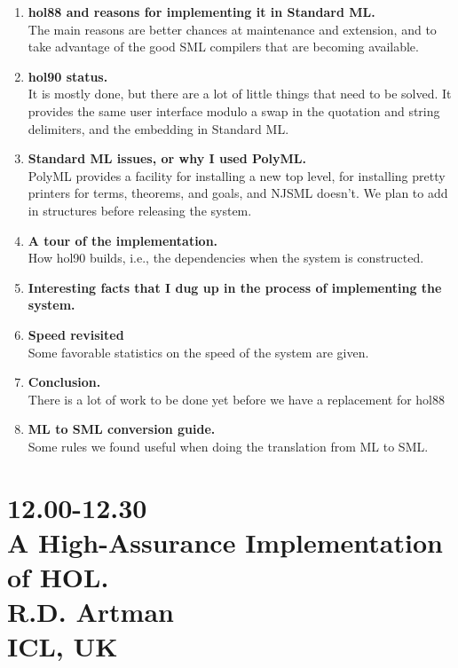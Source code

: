 \begin{enumerate}
\item {\bf hol88 and reasons for implementing it in Standard ML.}\\
     The main reasons are better chances at maintenance and
     extension, and to take advantage of the good SML compilers
     that are becoming available.

\item {\bf hol90 status.}\\
     It is mostly done, but there are a lot of little things
     that need to be solved. It provides the same user interface 
     modulo a swap in the quotation and string delimiters, and the 
     embedding in Standard ML. 

\item {\bf Standard ML issues, or why I used PolyML. }\\
     PolyML provides a facility for installing a new top level,
     for installing pretty printers for terms, theorems, and goals, and
     NJSML doesn't. We plan to add in structures before releasing the system.

\item {\bf A tour of the implementation.}\\
     How hol90 builds, i.e., the dependencies when the system is constructed.

\item {\bf Interesting facts that I dug up in the process of
      implementing the system.}

\item {\bf Speed revisited}\\
     Some favorable statistics on the speed of the system are given.

\item {\bf Conclusion.}\\
    There is a lot of work to be done yet before we have a replacement for
     hol88

\item {\bf ML to SML conversion guide.}\\
     Some rules we found useful when doing the translation from ML to SML.

\end{enumerate}

\newpage
\section*{12.00-12.30\\
A High-Assurance Implementation of HOL.\\
R.D. Artman \\
\large\bf ICL, UK}

